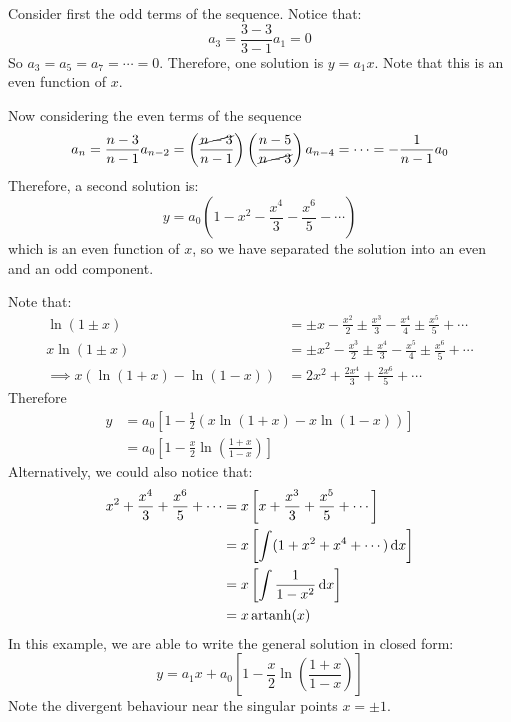 \documentclass[../main.tex]{subfiles}
\begin{document}
\begin{example}
  Consider first the odd terms of the sequence.
  Notice that:
  \[
    a_3 = \frac{3 - 3}{3 - 1} a_1 = 0
  \]
  So $a_3 = a_5 = a_7 = \cdots = 0$.
  Therefore, one solution is $y = a_1 x$.
  Note that this is an even function of $x$.

  Now considering the even terms of the sequence
  \[
    a_n = \frac{n - 3}{n - 1}a_{n - 2} = \left(\frac{\cancel{n - 3}}{n - 1}\right)\left(\frac{n - 5}{\cancel{n - 3}}\right)a_{n - 4} = \cdots = - \frac{1}{n - 1}a_0
  \]
  Therefore, a second solution is:
  \[
    y = a_0 \left(1 - x^2 - \frac{x^4}{3} - \frac{x^{6}}{5} - \cdots\right)
  \]
  which is an even function of $x$, so we have separated the solution into an even and an odd component.

  Note that:
  \begin{align*}
    \ln (1 \pm x) &= \pm x - \frac{x^2}{2} \pm \frac{x^3}{3} - \frac{x^4}{4} \pm \frac{x^5}{5} + \cdots \\
    x\ln(1 \pm x) &= \pm x^2 - \frac{x^3}{2} \pm \frac{x^4}{3} - \frac{x^5}{4} \pm \frac{x^6}{5} + \cdots \\
    \implies x(\ln(1 + x) - \ln(1 - x)) &= 2x^2 + \frac{2x^4}{3} + \frac{2x^6}{5} + \cdots
  \end{align*}
  Therefore
  \begin{align*}
    y &= a_0 \left[1 - \frac{1}{2}(x\ln(1 + x) - x\ln(1 - x))\right] \\
      &= a_0 \left[1 - \frac{x}{2}\ln\left(\frac{1 + x}{1 - x}\right)\right]
  \end{align*}
  Alternatively, we could also notice that:
  \begin{align*}
    x^2 + \frac{x^4}{3} + \frac{x^{6}}{5} + \cdots &= x\left[x + \frac{x^{3}}{3} + \frac{x^{5}}{5} + \cdots \right] \\
                                                 &= x\left[\int (1 + x^2 + x^{4} + \cdots) \d{x}\right] \\
                                                 &= x\left[\int \frac{1}{1 - x^2} \d{x}\right] \\
                                                 &= x\artanh(x)
  \end{align*}
  In this example, we are able to write the general solution in closed form:
  \[
    y = a_1 x + a_0 \left[1 - \frac{x}{2}\ln\left(\frac{1 + x}{1 - x}\right)\right]
  \]
  Note the divergent behaviour near the singular points $x = \pm 1$.
\end{example}
\end{document}
